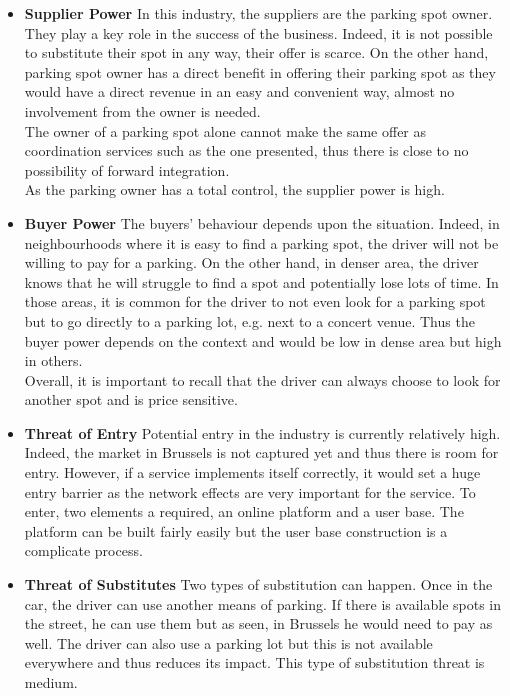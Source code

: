 \documentclass[12pt,a4paper,oneside]{book}
\begin{document}
\begin{itemize}
\item \textbf{Supplier Power} In this industry, the suppliers are the parking spot owner. They play a key role in the success of the business. Indeed, it is not possible to substitute their spot in any way, their offer is scarce. On the other hand, parking spot owner has a direct benefit in offering their parking spot as they would have a direct revenue in an easy and convenient way, almost no involvement from the owner is needed.\\
The owner of a parking spot alone cannot make the same offer as coordination services such as the one presented, thus there is close to no possibility of forward integration.\\
As the parking owner has a total control, the supplier power is high.
\item \textbf{Buyer Power} The buyers' behaviour depends upon the situation. Indeed, in neighbourhoods where it is easy to find a parking spot, the driver will not be willing to pay for a parking. On the other hand, in denser area, the driver knows that he will struggle to find a spot and potentially lose lots of time. In those areas, it is common for the driver to not even look for a parking spot but to go directly to a parking lot, e.g. next to a concert venue. Thus the buyer power depends on the context and would be low in dense area but high in others.\\
Overall, it is important to recall that the driver can always choose to look for another spot and is price sensitive.
\item \textbf{Threat of Entry} Potential entry in the industry is currently relatively high. Indeed, the market in Brussels is not captured yet and thus there is room for entry. However, if a service implements itself correctly, it would set a huge entry barrier as the network effects are very important for the service. To enter, two elements a required, an online platform and a user base. The platform can be built fairly easily but the user base construction is a complicate process.
\item \textbf{Threat of Substitutes} Two types of substitution can happen. Once in the car, the driver can use another means of parking. If there is available spots in the street, he can use them but as seen, in Brussels he would need to pay as well. The driver can also use a parking lot but this is not available everywhere and thus reduces its impact. This type of substitution threat is medium.\\

\end{itemize}
\end{document}
